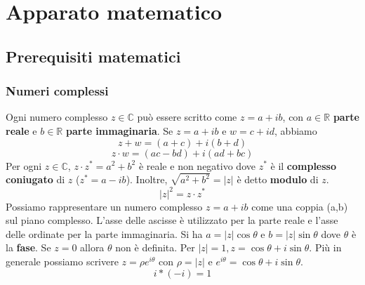 \documentclass[12pt, a4paper]{report}
\begin{document}
\chapter{Apparato matematico}
\section{Prerequisiti matematici}
\subsection{Numeri complessi}
Ogni numero complesso $z\in \mathbb{C}$ può essere scritto come $z=a+ib$, con $a\in \mathbb{R}$ \textbf{parte reale} e $b\in \mathbb{R}$ \textbf{parte immaginaria}. Se $z=a+ib$ e $w=c+id$, abbiamo
\begin{equation*}
    z+w = (a+c) + i(b+d)
\end{equation*}
\begin{equation*}
    z\cdot w = (ac-bd) + i(ad+bc)
\end{equation*}
Per ogni $z\in \mathbb{C}$, $z\cdot z^{*}=a^{2}+b^{2}$ è reale e non negativo dove $z^{*}$ è il \textbf{complesso coniugato} di $z$ ($z^{*}=a-ib$). Inoltre, $\sqrt{a^{2}+b^{2}}=\lvert z\rvert$ è detto \textbf{modulo} di $z$.
\begin{equation*}
    \lvert z\rvert^{2} = z\cdot z^{*}
\end{equation*}
Possiamo rappresentare un numero complesso $z=a+ib$ come una coppia (a,b) sul piano complesso. L'asse delle ascisse è utilizzato per la parte reale e l'asse delle ordinate per la parte immaginaria. Si ha $a = \lvert z \rvert \cos \theta$ e $b = \lvert z \rvert \sin \theta$ dove $\theta$ è la \textbf{fase}. Se $z=0$ allora $\theta$ non è definita. Per $\lvert z \rvert = 1, z=\cos\theta + i\sin\theta$. Più in generale possiamo scrivere $z=\rho e^{i\theta}$ con $\rho=\lvert z \rvert$ e $e^{i\theta}=\cos\theta + i\sin\theta$.
\begin{equation*}
    i*(-i) = 1
\end{equation*}
\end{document}
